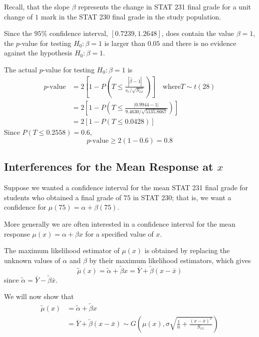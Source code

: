 Recall, that the slope $ \beta $ represents the change in STAT 231 final grade
for a unit change of $ 1 $ mark in the STAT 230 final grade in the study population.
\begin{exbox}
    \begin{example}[Testing $ H_0:\beta=1 $ for STAT 230/231 Final Grades]
        Since the $ 95\% $ confidence interval, $ \left[ 0.7239,1.2648 \right] $,
        does contain the value $ \beta=1 $, the $ p $-value for testing
        $ H_0:\beta=1 $ is larger than $ 0.05 $ and there is no evidence against the hypothesis
        $ H_0:\beta=1 $.

        The actual $ p $-value for testing $ H_0:\beta=1 $ is
        \[
            \begin{aligned}
                p\text{-value}
                 & =2\left[1-P\left(T \leq \frac{|\hat{\beta}-1|}{s_{e} / \sqrt{S_{x x}}}\right)\right]
                \quad \text{where} T \sim t(28)                                                         \\
                 & =2\left[1-P\left(T \leq \frac{|0.9944-1|}{9.4630 / \sqrt{5135.8667}}\right)\right]   \\
                 & =2[1-P(T \leq 0.0428)]
            \end{aligned}
        \]
        Since $ P(T\leqslant 0.2558)=0.6 $,
        \[ p\text{-value}\geqslant 2(1-0.6)=0.8 \]
    \end{example}
\end{exbox}

\subsection{Interferences for the Mean Response at $ x $}
Suppose we wanted a confidence interval for the mean STAT 231 final grade for students
who obtained a final grade of $ 75 $ in STAT 230; that is, we want a confidence
for $ \mu(75)=\alpha+\beta(75) $.

More generally we are often interested in a confidence interval for the mean
response $ \mu(x)=\alpha+\beta x $ for a specified value of $ x $.

The maximum likelihood estimator of $ \mu(x) $ is obtained by replacing the unknown
values of $ \alpha $ and $ \beta $ by their maximum likelihood estimators,
which gives
\[\tilde{\mu}(x)
    =\tilde{\alpha}+\tilde{\beta} x
    =\bar{Y}+\tilde{\beta}(x-\bar{x})\]
since $ \tilde{\alpha}=\bar{Y}-\tilde{\beta}\bar{x} $.

We will now show that
\[
    \begin{aligned}
        \tilde{\mu}(x)
         & =\tilde{\alpha}+\tilde{\beta}x                                      \\
         & =\bar{Y}+\tilde{\beta}\left( x-\bar{x} \right) \sim G\left( \mu(x),
        \sigma \sqrt{\frac{1}{n}+\frac{\left( x-\bar{x} \right)^2}{S_{xx}}} \right)
    \end{aligned}
\]

